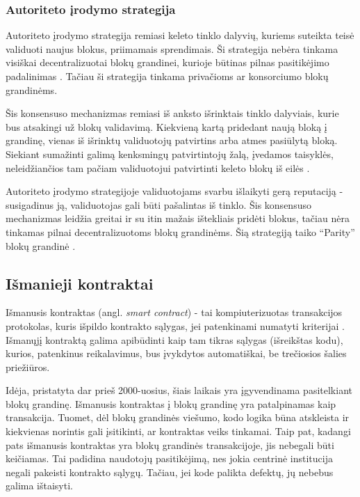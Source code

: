 \subsubsection{Autoriteto įrodymo strategija}

Autoriteto įrodymo strategija remiasi keleto tinklo dalyvių, kuriems suteikta teisė validuoti naujus blokus, priimamais sprendimais. Ši strategija nebėra tinkama visiškai
decentralizuotai blokų grandinei, kurioje būtinas pilnas pasitikėjimo padalinimas \cite{ProofOfAuthority}. Tačiau ši strategija tinkama privačioms
ar konsorciumo blokų grandinėms.

Šis konsensuso mechanizmas remiasi iš anksto išrinktais tinklo dalyviais, kurie bus atsakingi už blokų validavimą. Kiekvieną kartą pridedant naują
bloką į grandinę, vienas iš išrinktų validuotojų patvirtins arba atmes pasiūlytą bloką. Siekiant sumažinti galimą kenksmingų patvirtintojų žalą,
įvedamos taisyklės, neleidžiančios tam pačiam validuotojui patvirtinti keleto blokų iš eilės \cite{ProofOfAuthority}.

Autoriteto įrodymo strategijoje validuotojams svarbu išlaikyti gerą reputaciją - susigadinus ją, validuotojas gali būti pašalintas iš tinklo. Šis konsensuso mechanizmas
leidžia greitai ir su itin mažais ištekliais pridėti blokus, tačiau nėra tinkamas pilnai decentralizuotoms blokų grandinėms. Šią strategiją
taiko \enquote{Parity} blokų grandinė \cite{ProofOfAuthority}.

\subsection{Išmanieji kontraktai}

Išmanusis kontraktas (angl. \textit{smart contract}) - tai kompiuterizuotas transakcijos protokolas, kuris
išpildo kontrakto sąlygas, jei patenkinami numatyti kriterijai \cite{Szabo1997}.
Išmanųjį kontraktą galima apibūdinti kaip tam tikras sąlygas (išreikštas kodu), kurios, patenkinus reikalavimus, bus įvykdytos automatiškai,
be trečiosios šalies priežiūros.

Idėja, pristatyta dar prieš 2000-uosius, šiais laikais yra įgyvendinama pasitelkiant blokų grandinę. Išmanusis kontraktas
į blokų grandinę yra patalpinamas kaip transakcija. Tuomet, dėl blokų grandinės viešumo, kodo logika būna atskleista ir kiekvienas norintis
gali įsitikinti, ar kontraktas veiks tinkamai. Taip pat, kadangi pats išmanusis kontraktas yra blokų grandinės transakcijoje, jis nebegali būti keičiamas.
Tai padidina naudotojų pasitikėjimą, nes jokia centrinė institucija negali
pakeisti kontrakto sąlygų. Tačiau, jei kode palikta defektų, jų nebebus galima ištaisyti.

